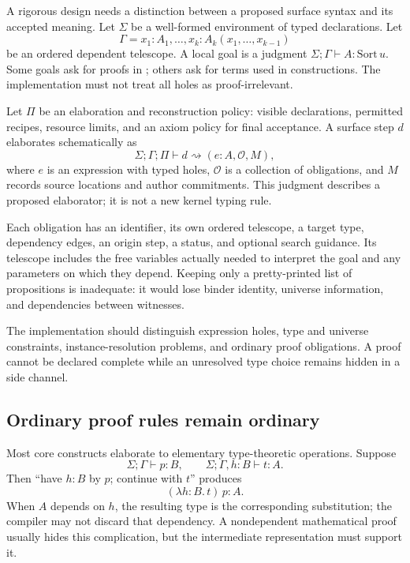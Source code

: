 \documentclass[11pt,letterpaper]{article}
\newcommand{\code}[1]{\texttt{\detokenize{#1}}}
\newcommand{\Ob}{\mathcal O}
\theoremstyle{remark}
\begin{document}
A rigorous design needs a distinction between a proposed surface syntax and its accepted meaning. Let $\Sigma$ be a well-formed environment of typed declarations. Let
\[
 \Gamma=x_1:A_1,\ldots,x_k:A_k(x_1,\ldots,x_{k-1})
\]
be an ordered dependent telescope. A local goal is a judgment $\Sigma;\Gamma\vdash A:\mathrm{Sort}\,u$. Some goals ask for proofs in \code{Prop}; others ask for terms used in constructions. The implementation must not treat all holes as proof-irrelevant.

Let $\Pi$ be an elaboration and reconstruction policy: visible declarations, permitted recipes, resource limits, and an axiom policy for final acceptance. A surface step $d$ elaborates schematically as
\begin{equation}
 \Sigma;\Gamma;\Pi\vdash d\rightsquigarrow(e:A,\Ob,M),
 \label{eq:elaboration}
\end{equation}
where $e$ is an expression with typed holes, $\Ob$ is a collection of obligations, and $M$ records source locations and author commitments. This judgment describes a proposed elaborator; it is not a new kernel typing rule.

Each obligation has an identifier, its own ordered telescope, a target type, dependency edges, an origin step, a status, and optional search guidance. Its telescope includes the free variables actually needed to interpret the goal and any parameters on which they depend. Keeping only a pretty-printed list of propositions is inadequate: it would lose binder identity, universe information, and dependencies between witnesses.

The implementation should distinguish expression holes, type and universe constraints, instance-resolution problems, and ordinary proof obligations. A proof cannot be declared complete while an unresolved type choice remains hidden in a side channel.

\subsection{Ordinary proof rules remain ordinary}

Most core constructs elaborate to elementary type-theoretic operations. Suppose
\[
 \Sigma;\Gamma\vdash p:B,
 \qquad
 \Sigma;\Gamma,h:B\vdash t:A.
\]
Then ``have $h:B$ by $p$; continue with $t$'' produces
\[
 (\lambda h:B.\,t)\,p:A.
\]
When $A$ depends on $h$, the resulting type is the corresponding substitution; the compiler may not discard that dependency. A nondependent mathematical proof usually hides this complication, but the intermediate representation must support it.
\end{document}
